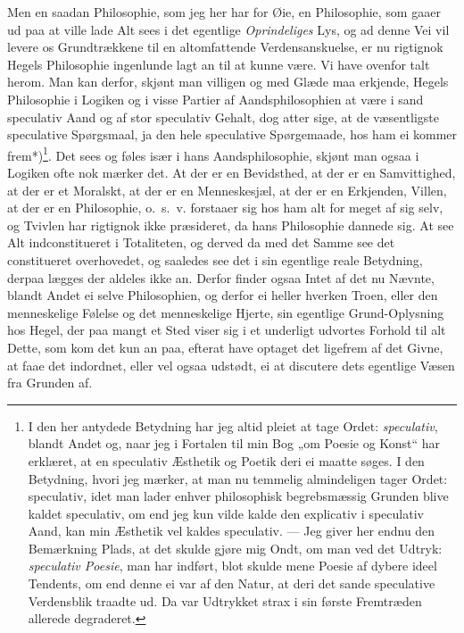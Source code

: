 \documentclass[12pt,a4paper]{book}
\newcommand{\apage}[1]{\marginnote{\footnotesize\textit{[#1]}}}
\begin{document}
Men en saadan Philosophie, som jeg her har for Øie, en Philosophie, som
gaaer ud paa at ville lade Alt sees i det egentlige \emph{Oprindeliges} Lys,
og ad denne Vei vil levere os Grundtrækkene til en altomfattende
Verdensanskuelse, er nu rigtignok Hegels Philosophie ingenlunde lagt an
til at kunne være. Vi have ovenfor talt herom. Man kan derfor, skjønt
man villigen og med Glæde maa erkjende, Hegels Philosophie i Logiken og
i visse Partier af Aandsphilosophien at være i sand speculativ Aand og
af stor speculativ Gehalt, dog atter sige, at de væsentligste
speculative Spørgsmaal, ja den hele speculative Spørgemaade, hos ham ei
kommer frem*)\footnote{I den her antydede Betydning har jeg altid pleiet
at tage Ordet: \emph{speculativ}, blandt Andet og, naar jeg i Fortalen til min
Bog „om Poesie og Konst“ har erklæret, at en speculativ Æsthetik og
Poetik deri ei maatte søges. I den Betydning, hvori jeg mærker, at man
nu temmelig almindeligen tager Ordet: speculativ, idet man lader enhver
philosophisk begrebsmæssig Grunden blive kaldet speculativ, om end jeg
kun vilde kalde den explicativ i speculativ Aand, kan min Æsthetik vel
kaldes speculativ. --- Jeg giver her endnu den Bemærkning Plads, at det
skulde gjøre mig Ondt, om man ved det Udtryk: \emph{speculativ Poesie}, man
har indført, blot skulde mene Poesie af dybere ideel Tendents, om end
denne ei var af den Natur, at deri det sande speculative Verdensblik
traadte ud. Da var Udtrykket strax i sin første Fremtræden allerede
degraderet.}. Det sees og føles især i hans \apage{70} Aandsphilosophie, skjønt
man ogsaa i Logiken ofte nok mærker det. At der er en Bevidsthed, at
der er en Samvittighed, at der er et Moralskt, at der er en
Menneskesjæl, at der er en Erkjenden, Villen, at der er en Philosophie,
o.\ s.\ v. forstaaer sig hos ham alt for meget af sig selv, og Tvivlen
har rigtignok ikke præsideret, da hans Philosophie dannede sig. At see
Alt indconstitueret i Totaliteten, og derved da med det Samme see det
constitueret overhovedet, og saaledes see det i sin egentlige reale
Betydning, derpaa lægges der aldeles ikke an. Derfor finder ogsaa Intet
af det nu Nævnte, blandt Andet ei selve Philosophien, og derfor ei
heller hverken Troen, eller den menneskelige Følelse og det
menneskelige Hjerte, sin egentlige Grund-Oplysning hos Hegel, der paa
mangt et Sted viser sig i et underligt udvortes Forhold til alt Dette,
som kom det kun an paa, efterat have optaget det ligefrem af det Givne,
at faae det indordnet, eller vel ogsaa udstødt, ei at discutere dets
egentlige Væsen fra Grunden af.
\end{document}
